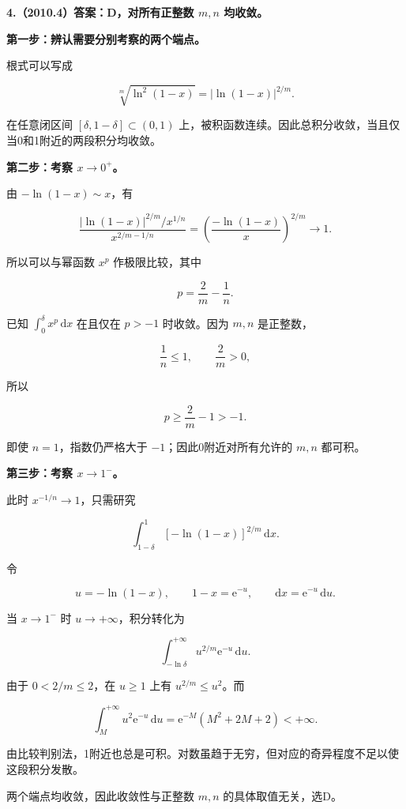 \documentclass[UTF8,11pt,fontset=windows]{ctexart}
\begin{document}
\clearpage

\textbf{4.（2010.4）答案：D，对所有正整数 $m,n$ 均收敛。}

\textbf{第一步：辨认需要分别考察的两个端点。}

根式可以写成

$$
\sqrt[m]{\ln^2(1-x)}=|\ln(1-x)|^{2/m}.
$$

在任意闭区间 $[\delta,1-\delta]\subset(0,1)$ 上，被积函数连续。因此总积分收敛，当且仅当0和1附近的两段积分均收敛。

\textbf{第二步：考察 $x\to0^+$。}

由 $-\ln(1-x)\sim x$，有

$$
\frac{|\ln(1-x)|^{2/m}/x^{1/n}}{x^{2/m-1/n}}
=\left(\frac{-\ln(1-x)}x\right)^{2/m}\longrightarrow1.
$$

所以可以与幂函数 $x^p$ 作极限比较，其中

$$
p=\frac2m-\frac1n.
$$

已知 $\int_0^\delta x^p\,\mathrm dx$ 在且仅在 $p>-1$ 时收敛。因为 $m,n$ 是正整数，

$$
\frac1n\le1,\qquad \frac2m>0,
$$

所以

$$
p\ge\frac2m-1>-1.
$$

即使 $n=1$，指数仍严格大于 $-1$；因此0附近对所有允许的 $m,n$ 都可积。

\textbf{第三步：考察 $x\to1^-$。}

此时 $x^{-1/n}\to1$，只需研究

$$
\int_{1-\delta}^1[-\ln(1-x)]^{2/m}\,\mathrm dx.
$$

令

$$
u=-\ln(1-x),\qquad 1-x=\mathrm e^{-u},
\qquad \mathrm dx=\mathrm e^{-u}\,\mathrm du.
$$

当 $x\to1^-$ 时 $u\to+\infty$，积分转化为

$$
\int_{-\ln\delta}^{+\infty}u^{2/m}\mathrm e^{-u}\,\mathrm du.
$$

由于 $0<2/m\le2$，在 $u\ge1$ 上有 $u^{2/m}\le u^2$。而

$$
\int_M^{+\infty}u^2\mathrm e^{-u}\,\mathrm du
=\mathrm e^{-M}(M^2+2M+2)<+\infty.
$$

由比较判别法，1附近也总是可积。对数虽趋于无穷，但对应的奇异程度不足以使这段积分发散。

两个端点均收敛，因此收敛性与正整数 $m,n$ 的具体取值无关，选D。

\clearpage
\end{document}
